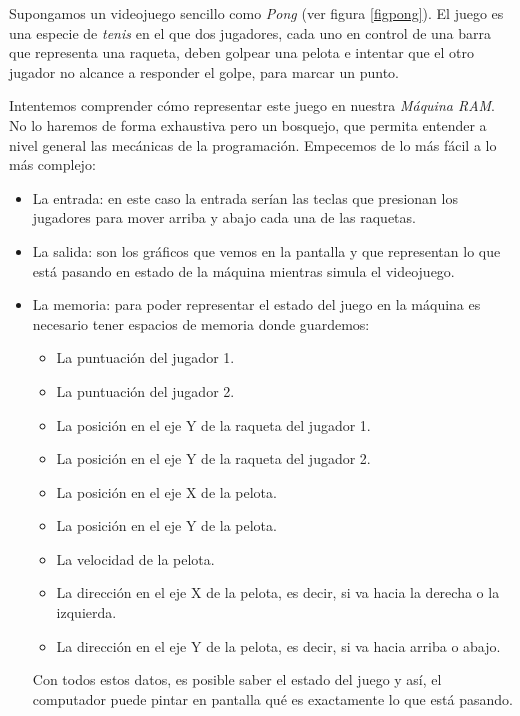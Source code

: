 Supongamos un videojuego sencillo como \emph{Pong} (ver figura \ref{figpong}). El juego es una especie de \emph{tenis} en el que dos jugadores, cada uno en control de una barra que representa una raqueta, deben golpear una pelota e intentar que el otro jugador no alcance a responder el golpe, para marcar un punto. 

Intentemos comprender cómo representar este juego en nuestra \emph{Máquina RAM}. No lo haremos de forma exhaustiva pero un bosquejo, que permita entender a nivel general las mecánicas de la programación. Empecemos de lo más fácil a lo más complejo:

\begin{itemize}

	
	\item La entrada: en este caso la entrada serían las teclas que presionan los jugadores para mover arriba y abajo cada una de las raquetas.
	
	\item La salida: son los gráficos que vemos en la pantalla y que representan lo que está pasando en estado de la máquina mientras simula el videojuego.
	
	\item La memoria: para poder representar el estado del juego en la máquina es necesario tener espacios de memoria donde guardemos:
	
	\begin{itemize}
		\item La puntuación del jugador 1.
		\item La puntuación del jugador 2.
		\item La posición en el eje Y de la raqueta del jugador 1.
		\item La posición en el eje Y de la raqueta del jugador 2.
		\item La posición en el eje X de la pelota.
		\item La posición en el eje Y de la pelota.
		\item La velocidad de la pelota.
		\item La dirección en el eje X de la pelota, es decir, si va hacia la derecha o la izquierda.
		\item La dirección en el eje Y de la pelota, es decir, si va hacia arriba o abajo.
	\end{itemize}

	Con todos estos datos, es posible saber el estado del juego y así, el computador puede pintar en pantalla qué es exactamente lo que está pasando.
	

\end{itemize}
